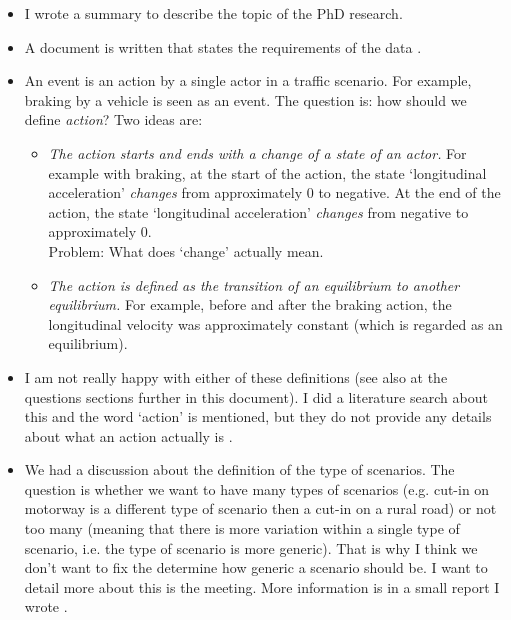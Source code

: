 \documentclass[10pt,final,a4paper,oneside,onecolumn]{article}
\begin{document}
\begin{itemize}
	\item I wrote a summary to describe the topic of the PhD research.
	\item A document is written that states the requirements of the data \cite{data_requirements}.
	\item An event is an action by a single actor in a traffic scenario. For example, braking by a vehicle is seen as an event. The question is: how should we define \emph{action}? Two ideas are:
	\begin{itemize}
		\item \emph{The action starts and ends with a change of a state of an actor.}
		For example with braking, at the start of the action, the state `longitudinal acceleration' \emph{changes} from approximately 0 to negative. At the end of the action, the state `longitudinal acceleration' \emph{changes} from negative to approximately 0. \\
		Problem: What does `change' actually mean. 
		\item \emph{The action is defined as the transition of an equilibrium to another equilibrium.}
		For example, before and after the braking action, the longitudinal velocity was approximately constant (which is regarded as an equilibrium).
	\end{itemize}
	\item I am not really happy with either of these definitions (see also at the questions sections further in this document). I did a literature search about this and the word `action' is mentioned, but they do not provide any details about what an action actually is \cite{scenario_ontology,ulbrich2015}.
	\item We had a discussion about the definition of the type of scenarios. The question is whether we want to have many types of scenarios (e.g. cut-in on motorway is a different type of scenario then a cut-in on a rural road) or not too many (meaning that there is more variation within a single type of scenario, i.e. the type of scenario is more generic). That is why I think we don't want to fix the determine how generic a scenario should be. I want to detail more about this is the meeting. More information is in a small report I wrote \cite{categorizationScenarios}.
\end{itemize}
\end{document}
